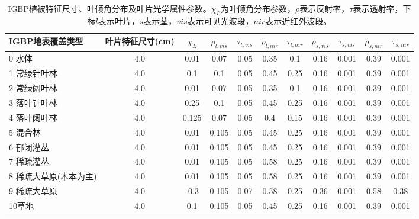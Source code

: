 \begin{sidewaystable}[]
    \centering
    \caption{IGBP植被特征尺寸、叶倾角分布及叶片光学属性参数。$\chi_L$为叶倾角分布参数，$\rho$表示反射率，$\tau$表示透射率，下标$l$表示叶片，$s$表示茎，$vis$表示可见光波段，$nir$表示近红外波段。}
    \label{tab:IGBP植被特征尺寸叶倾角分布及叶片光学属性参数1}
        \begin{tabular}{@{}lcccccccccc@{}}
        \toprule
        IGBP地表覆盖类型     & 叶片特征尺寸(cm) & $\chi_L$ &$\rho_{l, vis}$ & $\tau_{l, vis}$  &$\rho_{l, nir}$ &$\tau_{l, nir}$ & $\rho_{s, vis}$ &$\tau_{s, vis}$ &$\rho_{s, nir}$ &$\tau_{s, nir}$\\ \midrule
        0 水体          & 4.0        & 0.01  & 0.07  & 0.05 & 0.35 & 0.1  & 0.16 & 0.001 & 0.39 & 0.001 \\
        1 常绿针叶林       & 4.0        & 0.1   & 0.1   & 0.05 & 0.45 & 0.25 & 0.16 & 0.001 & 0.39 & 0.001 \\
        2 常绿阔叶林       & 4.0        & 0.01  & 0.07  & 0.05 & 0.35 & 0.1  & 0.16 & 0.001 & 0.39 & 0.001 \\
        3 落叶针叶林       & 4.0        & 0.25  & 0.1   & 0.05 & 0.45 & 0.25 & 0.16 & 0.001 & 0.39 & 0.001 \\
        4 落叶阔叶林       & 4.0        & 0.125 & 0.07  & 0.05 & 0.4  & 0.15 & 0.16 & 0.001 & 0.39 & 0.001 \\
        5 混合林         & 4.0        & 0.01  & 0.105 & 0.05 & 0.45 & 0.25 & 0.16 & 0.001 & 0.39 & 0.001 \\
        6 郁闭灌丛        & 4.0        & 0.01  & 0.105 & 0.05 & 0.45 & 0.25 & 0.16 & 0.001 & 0.39 & 0.001 \\
        7 稀疏灌丛        & 4.0        & 0.01  & 0.105 & 0.05 & 0.58 & 0.25 & 0.16 & 0.001 & 0.39 & 0.001 \\
        8 稀疏大草原(木本为主) & 4.0        & 0.01  & 0.105 & 0.05 & 0.58 & 0.25 & 0.16 & 0.001 & 0.39 & 0.001 \\
        9 稀疏大草原       & 4.0        & -0.3  & 0.105 & 0.07 & 0.58 & 0.25 & 0.36 & 0.001 & 0.58 & 0.38  \\
        10草地          & 4.0        & 0.1   & 0.105 & 0.05 & 0.45 & 0.25 & 0.16 & 0.001 & 0.39 & 0.001 \\ %
% 

\end{tabular}
\end{sidewaystable}
